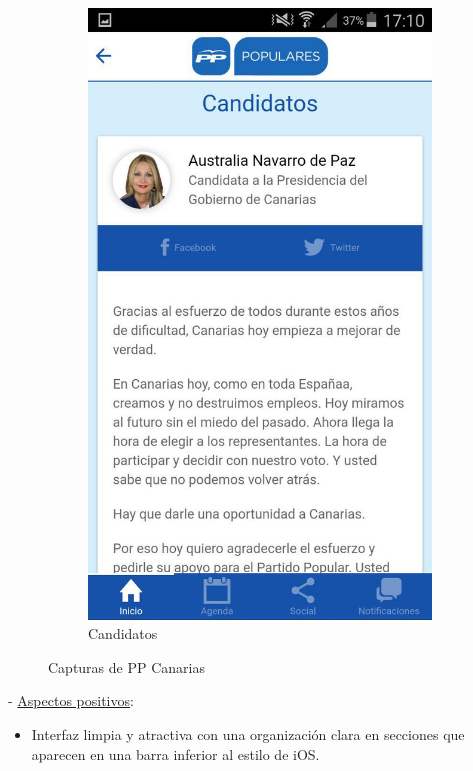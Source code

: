 \begin{figure}[H]
\begin{subfigure}[b]{0.3\textwidth}
                \includegraphics[width=\textwidth]{Media/Captures/ppCanariasCandidates.jpg}
                \caption{Candidatos}
                \label{fig:ppCandidates}
        \end{subfigure}
        \caption{Capturas de PP Canarias}
        \label{fig:ppCanarias}
\end{figure}

 - \underline{Aspectos positivos}:

\begin{itemize}
	\item Interfaz limpia y atractiva con una organización clara en secciones que aparecen en una barra inferior al estilo de iOS.
\end{itemize}

